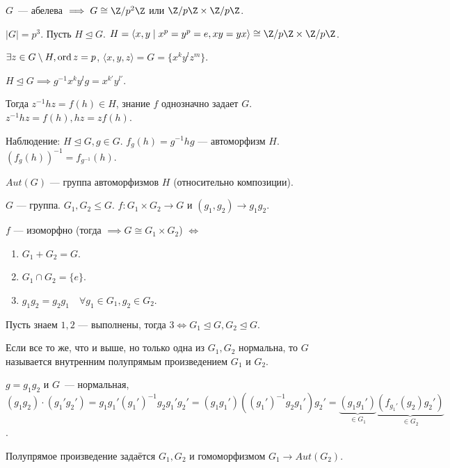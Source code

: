 \begin{remark}
    $G$~--- абелева $\implies G \cong \Z / p^2 \Z$ или $\Z / p \Z \times \Z / p \Z$.
\end{remark}
\begin{example}
    $|G| = p^3$.
    Пусть $H \trianglelefteq G$.  $H = \langle x, y \mid x^p = y^p = e, xy=yx\rangle \cong \Z / p\Z \times \Z / p\Z$.

     $\exists z \in G \setminus H, \operatorname{ord} z = p$, $\langle x, y, z\rangle = G = \{ x^k y^l z^m \}$.

     $H \trianglelefteq G \implies g^{-1}x^{k}y^{l}g = x^{k'}y^{l'}$.

     Тогда $z^{-1}hz = f(h) \in H$, знание  $f$ однозначно задает  $G$.  $z^{-1}hz = f(h), hz = zf(h)$.

     Наблюдение: $H \trianglelefteq G, g \in G$.  $f_g(h) = g^{-1}hg$ --- автоморфизм  $H$. $(f_g(h))^{-1} = f_{g^{-1}}(h)$.
\end{example}
\begin{definition}
    $Aut(G)$ --- группа автоморфизмов  $H$ (относительно композиции).
\end{definition}
\begin{statement}
    $G$ --- группа.  $G_1, G_2 \le G$. $f\!: G_1 \times G_2 \to G$ и $(g_1,g_2) \to g_1g_2$.

    $f$ --- изоморфно (тогда $\implies G \cong G_1 \times G_2$) $\iff$
    \begin{enumerate}
        \item $G_1+G_2 = G$.
        \item $G_1 \cap G_2 = \{e\}$.
        \item $g_1g_2 = g_2g_1\quad \forall g_1 \in G_1, g_2 \in G_2$.
    \end{enumerate}
\end{statement}
\begin{exerc}
    Пусть знаем $1, 2$ --- выполнены, тогда  $3 \iff G_1 \trianglelefteq G, G_2 \trianglelefteq G$.
\end{exerc}
\begin{definition}
    Если все то же, что и выше, но только одна из $G_1, G_2$ нормальна, то $G$ называется внутренним полупрямым произведением  $G_1$ и $G_2$.

    $g = g_1g_2$ и $G$~--- нормальная, $(g_1g_2) \cdot (g_1' g_2') = g_1g_1'(g_1')^{-1}g_2g_1'g_2' = (g_1g_1')((g_1')^{-1}g_2g_1')g_2' = \underbrace{(g_1g_1')}_{\in G_1}\underbrace{(f_{g_1'}(g_2)g_2')}_{\in G_2}$.

    Полупрямое произведение задаётся $G_1, G_2$ и гомоморфизмом $G_1 \to Aut(G_2)$.
\end{definition}
